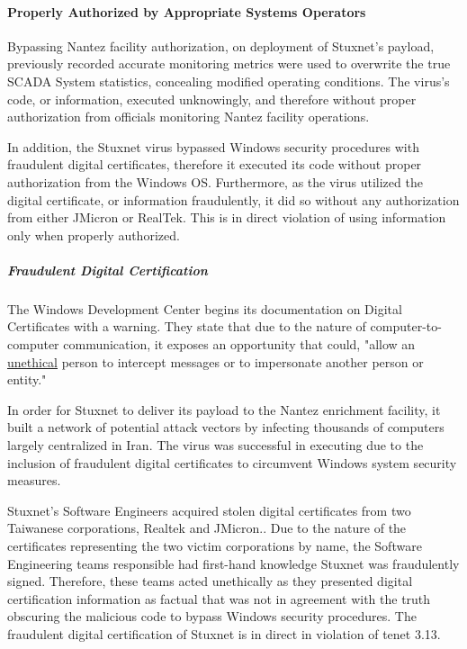 \documentclass[12pt]{article}
\begin{document}
\begin{multicols}{2}
\paragraph{Properly Authorized by Appropriate Systems Operators}

Bypassing Nantez facility authorization, on deployment of Stuxnet's payload, previously recorded accurate monitoring metrics were used to overwrite the true SCADA System statistics, concealing modified operating conditions.\cite{theRealStoryOfStuxnet} The virus's code, or information, executed unknowingly, and therefore without proper authorization from officials monitoring Nantez facility operations.

In addition, the Stuxnet virus bypassed Windows security procedures with fraudulent digital certificates, therefore it executed its code without proper authorization from the Windows OS. Furthermore, as the virus utilized the digital certificate, or information fraudulently, it did so without any authorization from either JMicron or RealTek.\cite{signedUsingCertificates} This is in direct violation of using information only when properly authorized.

\subparagraph{Fraudulent Digital Certification}

The Windows Development Center begins its documentation on Digital Certificates with a warning. They state that due to the nature of computer-to-computer communication, it exposes an opportunity that could, "allow an \ul{unethical} person to intercept messages or to impersonate another person or entity."\cite{moreOnDigitalCertificates}

In order for Stuxnet to deliver its payload to the Nantez enrichment facility, it built a network of potential attack vectors by infecting thousands of computers largely centralized in Iran.\cite{lessonsFromStuxnet} The virus was successful in executing due to the inclusion of fraudulent digital certificates to circumvent Windows system security measures.

Stuxnet's Software Engineers acquired stolen digital certificates from two Taiwanese corporations, Realtek and JMicron.\cite{signedUsingCertificates}. Due to the nature of the certificates representing the two victim corporations by name, the Software Engineering teams responsible had first-hand knowledge Stuxnet was fraudulently signed. Therefore, these teams acted unethically as they presented digital certification information as factual that was not in agreement with the truth obscuring the malicious code to bypass Windows security procedures. The fraudulent digital certification of Stuxnet is in direct in violation of tenet 3.13.


\end{multicols}
\end{document}
